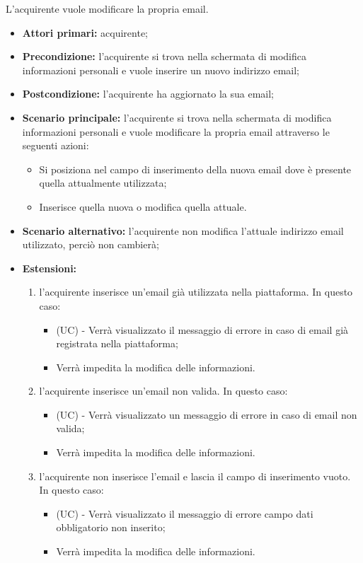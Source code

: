 L'acquirente vuole modificare la propria email.
\begin{itemize}
    \item \textbf{Attori primari:} acquirente;
    \item \textbf{Precondizione:} l'acquirente si trova nella schermata di modifica informazioni personali e vuole inserire un nuovo indirizzo email;
    \item \textbf{Postcondizione:} l'acquirente ha aggiornato la sua email;
    \item \textbf{Scenario principale:} l'acquirente si trova nella schermata di modifica informazioni personali e vuole modificare la propria email attraverso le seguenti azioni:
        \begin{itemize}
            \item Si posiziona nel campo di inserimento della nuova email dove è presente quella attualmente utilizzata;
            \item Inserisce quella nuova o modifica quella attuale.
        \end{itemize}
    \item \textbf{Scenario alternativo:} l'acquirente non modifica l'attuale indirizzo email utilizzato, perciò non cambierà;
    \item \textbf{Estensioni:} 
     \begin{enumerate}[label=\lett]
    \item l'acquirente inserisce un'email già utilizzata nella piattaforma. In questo caso:
    \begin{itemize}
        \item (UC) - Verrà visualizzato il messaggio di errore in caso di email già registrata nella piattaforma;
        \item Verrà impedita la modifica delle informazioni.
    \end{itemize}
    \item l'acquirente inserisce un'email non valida. In questo caso:
    \begin{itemize}
        \item (UC) - Verrà visualizzato un messaggio di errore in caso di email non valida;
        \item Verrà impedita la modifica delle informazioni.
    \end{itemize}
    \item l'acquirente non inserisce l'email e lascia il campo di inserimento vuoto. In questo caso:
    \begin{itemize}
        \item (UC) - Verrà visualizzato il messaggio di errore campo dati obbligatorio non inserito;
        \item Verrà impedita la modifica delle informazioni.
    \end{itemize}
\end{enumerate}
\end{itemize}

